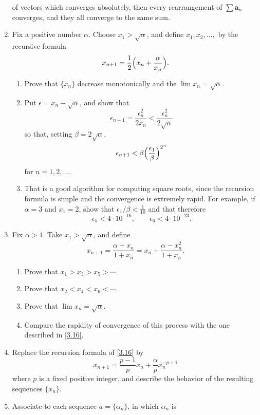 \begin{enumerate}
  of vectors which converges absolutely, then every rearrangement of
  \(\sum\mathbold{a}_n\) converges, and they all converge to the same sum.
  \par\smallskip
\item
  \label{3.16}
  Fix a positive number \(\alpha\).
  Choose \(x_1 > \sqrt{\alpha}\), and define \(x_1,x_2,\ldots,\) by the
  recursive formula
  \[
  x_{n + 1} = \frac{1}{2}\Bigl(x_n + \frac{\alpha}{x_n}\Bigr).
  \]
  \begin{enumerate}[label = (\alph*)]
  \item
    Prove that \(\{x_n\}\) decrease monotonically and the
    \(\lim x_n = \sqrt{\alpha}\).
  \item
    Put \(\epsilon = x_n - \sqrt{\alpha}\), and show that
    \[
    \epsilon_{n + 1} = \frac{\epsilon_n^2}{2x_n} <
    \frac{\epsilon_n^2}{2\sqrt{\alpha}}
    \]
    so that, setting \(\beta = 2\sqrt{\alpha}\),
    \[
    \epsilon_{n + 1} < \beta\Bigl(\frac{\epsilon_1}{\beta}\Bigr)^{2^n}
    \]
    for \(n = 1,2,\ldots\).
  \item
    That is a good algorithm for computing square roots, since the recursion
    formula is simple and the convergence is extremely rapid.
    For example, if \(\alpha = 3\) and \(x_1 = 2\), show that
    \(\epsilon_1/\beta < \frac{1}{10}\) and that therefore
    \[
    \epsilon_5 < 4\cdot 10^{-16},\qquad\epsilon_6 < 4\cdot 10^{-23}.
    \]
  \end{enumerate}
\item
  Fix \(\alpha > 1\).
  Take \(x_1 > \sqrt{\alpha}\), and define
  \[
  x_{n + 1} = \frac{\alpha + x_n}{1 + x_n} = x_n +
  \frac{\alpha - x_n^2}{1 + x_n}.
  \]
  \begin{enumerate}[label = (\alph*)]
  \item
    Prove that \(x_1 > x_3 > x_5 > \cdots\).
  \item
    Prove that \(x_2 < x_4 < x_6 < \cdots\).
  \item
    Prove that \(\lim x_n = \sqrt{\alpha}\).
  \item
    Compare the rapidity of convergence of this process with the one described
    in \cref{3.16}.
  \end{enumerate}
\item
  Replace the recursion formula of \cref{3.16} by
  \[
  x_{n + 1} = \frac{p - 1}{p}x_n + \frac{\alpha}{p}x_n^{-p + 1}
  \]
  where \(p\) is a fixed positive integer, and describe the behavior of the
  resulting sequences \(\{x_n\}\).
\item
  Associate to each sequence \(a = \{\alpha_n\}\), in which \(\alpha_n\) is

\end{enumerate}
